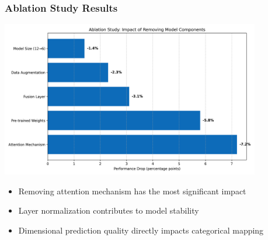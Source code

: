 \begin{frame}
\frametitle{Ablation Study Results}
\begin{center}
\includegraphics[width=0.85\textwidth]{figures/ablation_analysis.png}
\end{center}

\begin{itemize}
    \item Removing attention mechanism has the most significant impact
    \item Layer normalization contributes to model stability
    \item Dimensional prediction quality directly impacts categorical mapping
\end{itemize}
\end{frame}

